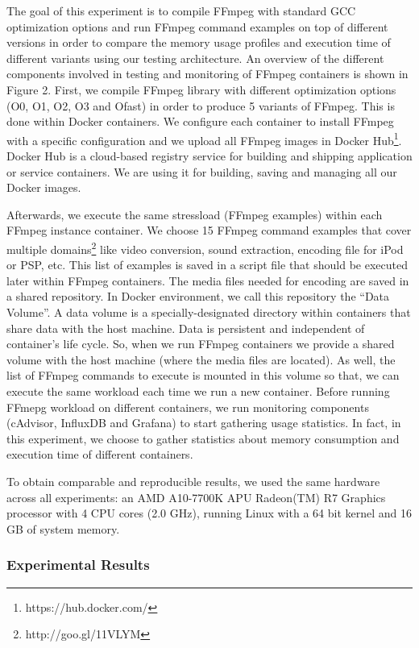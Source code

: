 The goal of this experiment is to compile FFmpeg with standard GCC optimization options and run FFmpeg command examples on top of different versions in order to compare the memory usage profiles and execution time of different variants using our testing architecture. An overview of the different components involved in testing and monitoring of FFmpeg containers is shown in Figure 2. 
First, we compile FFmpeg library with different optimization options  (O0, O1, O2, O3 and Ofast) in order to produce 5 variants of FFmpeg. This is done within Docker containers. We configure each container to install FFmpeg with a specific configuration and we upload all FFmpeg images in Docker Hub\footnote{https://hub.docker.com/}.
Docker Hub is a cloud-based registry service for building and shipping application or service containers. We are using it for building, saving and managing all our Docker images.

Afterwards, we execute the same stressload (FFmpeg examples) within each FFmpeg instance container. We choose 15 FFmpeg command examples that cover multiple domains\footnote{http://goo.gl/11VLYM} like video conversion, sound extraction, encoding file for iPod or PSP, etc. This list of examples is saved in a script file that should be executed later within FFmpeg containers. The media files needed for encoding are saved in a shared repository. In Docker environment, we call this repository the “Data Volume”. A data volume is a specially-designated directory within containers that share data with the host machine. Data is persistent and independent of container's life cycle. So, when we run FFmpeg containers we provide a shared volume with the host machine (where the media files are located). As well, the list of FFmpeg commands to execute is mounted in this volume so that, we can execute the same workload each time we run a new container.
Before running FFmepg workload on different containers, we run monitoring components (cAdvisor, InfluxDB and Grafana) to start gathering usage statistics.
In fact, in this experiment, we choose to gather statistics about memory consumption and execution time of different containers. 

To obtain comparable and reproducible results, we used the same hardware across all experiments: an AMD A10-7700K APU Radeon(TM) R7 Graphics processor with 4 CPU cores (2.0 GHz), running Linux with a 64 bit kernel and 16 GB of system memory.

\subsubsection{Experimental Results}

